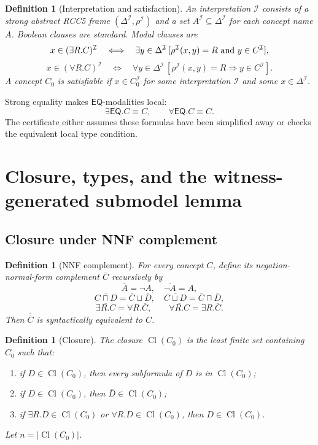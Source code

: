 \documentclass[11pt]{article}
\newtheorem{definition}[theorem]{Definition}
\newcommand{\EQ}{\mathsf{EQ}}
\newcommand{\Cl}{\operatorname{Cl}}
\newcommand{\I}{\mathcal I}
\begin{document}
\begin{definition}[Interpretation and satisfaction]\label{def:satisfaction}
An interpretation $\I$ consists of a strong abstract RCC5 frame $(\Delta^\I,\rho^\I)$ and a set $A^\I\subseteq\Delta^\I$ for each concept name $A$.  Boolean clauses are standard.  Modal clauses are
\[
 x\in(\exists R.C)^\I
 \quad\Longleftrightarrow\quad
 \exists y\in\Delta^\I\,[\rho^\I(x,y)=R\hbox{ and }y\in C^\I],
\]
\[
 x\in(\forall R.C)^\I
 \quad\Longleftrightarrow\quad
 \forall y\in\Delta^\I\,[\rho^\I(x,y)=R\Rightarrow y\in C^\I].
\]
A concept $C_0$ is satisfiable if $x\in C_0^\I$ for some interpretation $\I$ and some $x\in\Delta^\I$.
\end{definition}

Strong equality makes $\EQ$-modalities local:
\[
  \exists\EQ.C\equiv C,
  \qquad
  \forall\EQ.C\equiv C.
\]
The certificate either assumes these formulas have been simplified away or checks the equivalent local type condition.

\section{Closure, types, and the witness-generated submodel lemma}

\subsection{Closure under NNF complement}

\begin{definition}[NNF complement]\label{def:nnfcomp}
For every concept $C$, define its negation-normal-form complement $\overline C$ recursively by
\[
\overline A=\neg A,
\quad
\overline{\neg A}=A,
\]
\[
\overline{C\sqcap D}=\overline C\sqcup\overline D,
\quad
\overline{C\sqcup D}=\overline C\sqcap\overline D,
\]
\[
\overline{\exists R.C}=\forall R.\overline C,
\qquad
\overline{\forall R.C}=\exists R.\overline C.
\]
Then $\overline{\overline C}$ is syntactically equivalent to $C$.
\end{definition}

\begin{definition}[Closure]\label{def:closure}
The closure $\Cl(C_0)$ is the least finite set containing $C_0$ such that:
\begin{enumerate}[label=(C\arabic*)]
\item if $D\in\Cl(C_0)$, then every subformula of $D$ is in $\Cl(C_0)$;
\item if $D\in\Cl(C_0)$, then $\overline D\in\Cl(C_0)$;
\item if $\exists R.D\in\Cl(C_0)$ or $\forall R.D\in\Cl(C_0)$, then $D\in\Cl(C_0)$.
\end{enumerate}
Let $n=|\Cl(C_0)|$.
\end{definition}
\end{document}
